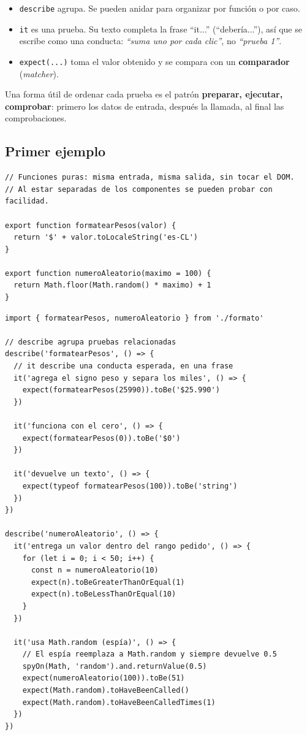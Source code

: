 \documentclass[11pt,a4paper]{article}
\newcommand{\cmd}[1]{\texttt{\color{reactdark}#1}}
\begin{document}
\begin{itemize}
  \item \cmd{describe} agrupa. Se pueden anidar para organizar por función o por caso.
  \item \cmd{it} es una prueba. Su texto completa la frase ``it...'' (``debería...''), así que se escribe como una conducta: \emph{``suma uno por cada clic''}, no \emph{``prueba 1''}.
  \item \cmd{expect(...)} toma el valor obtenido y se compara con un \textbf{comparador} (\emph{matcher}).
\end{itemize}

Una forma útil de ordenar cada prueba es el patrón \textbf{preparar, ejecutar, comprobar}: primero los datos de entrada, después la llamada, al final las comprobaciones.

\subsection{Primer ejemplo}

\begin{lstlisting}[language=JSX,title={\small\ttfamily src/logica/formato.js}]
// Funciones puras: misma entrada, misma salida, sin tocar el DOM.
// Al estar separadas de los componentes se pueden probar con facilidad.

export function formatearPesos(valor) {
  return '$' + valor.toLocaleString('es-CL')
}

export function numeroAleatorio(maximo = 100) {
  return Math.floor(Math.random() * maximo) + 1
}
\end{lstlisting}
\begin{lstlisting}[language=JSX,title={\small\ttfamily src/logica/formato.spec.js}]
import { formatearPesos, numeroAleatorio } from './formato'

// describe agrupa pruebas relacionadas
describe('formatearPesos', () => {
  // it describe una conducta esperada, en una frase
  it('agrega el signo peso y separa los miles', () => {
    expect(formatearPesos(25990)).toBe('$25.990')
  })

  it('funciona con el cero', () => {
    expect(formatearPesos(0)).toBe('$0')
  })

  it('devuelve un texto', () => {
    expect(typeof formatearPesos(100)).toBe('string')
  })
})

describe('numeroAleatorio', () => {
  it('entrega un valor dentro del rango pedido', () => {
    for (let i = 0; i < 50; i++) {
      const n = numeroAleatorio(10)
      expect(n).toBeGreaterThanOrEqual(1)
      expect(n).toBeLessThanOrEqual(10)
    }
  })

  it('usa Math.random (espía)', () => {
    // El espía reemplaza a Math.random y siempre devuelve 0.5
    spyOn(Math, 'random').and.returnValue(0.5)
    expect(numeroAleatorio(100)).toBe(51)
    expect(Math.random).toHaveBeenCalled()
    expect(Math.random).toHaveBeenCalledTimes(1)
  })
})
\end{lstlisting}
\end{document}

